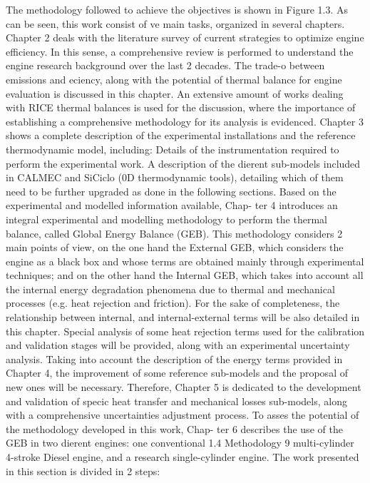 The methodology followed to achieve the objectives is shown in Figure
1.3. As can be seen, this work consist of ve main tasks, organized in several
chapters.
Chapter 2 deals with the literature survey of current strategies to optimize
engine efficiency. In this sense, a comprehensive review is performed
to understand the engine research background over the last 2 decades. The
trade-o between emissions and eciency, along with the potential of thermal
balance for engine evaluation is discussed in this chapter. An extensive amount
of works dealing with RICE thermal balances is used for the discussion, where
the importance of establishing a comprehensive methodology for its analysis
is evidenced.
Chapter 3 shows a complete description of the experimental installations
and the reference thermodynamic model, including:
 Details of the instrumentation required to perform the experimental
work.
 A description of the dierent sub-models included in CALMEC and SiCiclo
(0D thermodynamic tools), detailing which of them need to be further
upgraded as done in the following sections.
Based on the experimental and modelled information available, Chap-
ter 4 introduces an integral experimental and modelling methodology to perform
the thermal balance, called Global Energy Balance (GEB). This methodology
considers 2 main points of view, on the one hand the External GEB,
which considers the engine as a black box and whose terms are obtained mainly
through experimental techniques; and on the other hand the Internal GEB,
which takes into account all the internal energy degradation phenomena due
to thermal and mechanical processes (e.g. heat rejection and friction). For the
sake of completeness, the relationship between internal, and internal-external
terms will be also detailed in this chapter. Special analysis of some heat rejection
terms used for the calibration and validation stages will be provided,
along with an experimental uncertainty analysis.
Taking into account the description of the energy terms provided in
Chapter 4, the improvement of some reference sub-models and the proposal 
of new ones will be necessary. Therefore, Chapter 5 is dedicated to the
development and validation of specic heat transfer and mechanical losses
sub-models, along with a comprehensive uncertainties adjustment process.
To asses the potential of the methodology developed in this work, Chap-
ter 6 describes the use of the GEB in two dierent engines: one conventional
1.4 Methodology 9
multi-cylinder 4-stroke Diesel engine, and a research single-cylinder engine.
The work presented in this section is divided in 2 steps:
